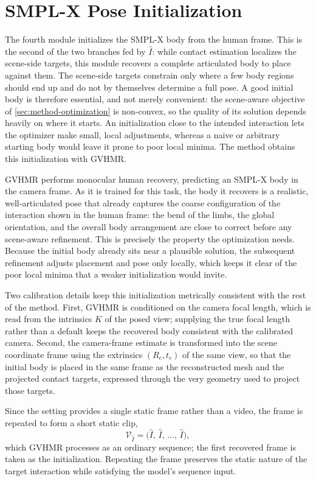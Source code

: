 \section{SMPL-X Pose Initialization}
\label{sec:method-pose-init}

The fourth module initializes the SMPL-X body from the human frame. This is the second of the two branches fed by $\hat{I}$: while contact estimation localizes the scene-side targets, this module recovers a complete articulated body to place against them. The scene-side targets constrain only where a few body regions should end up and do not by themselves determine a full pose. A good initial body is therefore essential, and not merely convenient: the scene-aware objective of \cref{sec:method-optimization} is non-convex, so the quality of its solution depends heavily on where it starts. An initialization close to the intended interaction lets the optimizer make small, local adjustments, whereas a naive or arbitrary starting body would leave it prone to poor local minima. The method obtains this initialization with GVHMR.

GVHMR performs monocular human recovery, predicting an SMPL-X body in the camera frame. As it is trained for this task, the body it recovers is a realistic, well-articulated pose that already captures the coarse configuration of the interaction shown in the human frame: the bend of the limbs, the global orientation, and the overall body arrangement are close to correct before any scene-aware refinement. This is precisely the property the optimization needs. Because the initial body already sits near a plausible solution, the subsequent refinement adjusts placement and pose only locally, which keeps it clear of the poor local minima that a weaker initialization would invite.

Two calibration details keep this initialization metrically consistent with the rest of the method. First, GVHMR is conditioned on the camera focal length, which is read from the intrinsics $K$ of the posed view; supplying the true focal length rather than a default keeps the recovered body consistent with the calibrated camera. Second, the camera-frame estimate is transformed into the scene coordinate frame using the extrinsics $(R_c, t_c)$ of the same view, so that the initial body is placed in the same frame as the reconstructed mesh and the projected contact targets, expressed through the very geometry used to project those targets.

Since the setting provides a single static frame rather than a video, the frame is repeated to form a short static clip,
\begin{equation}
\label{eq:static-human-clip}
\mathcal{V}_{\hat{I}} = \bigl( \hat{I},\, \hat{I},\, \ldots,\, \hat{I} \bigr),
\end{equation}
which GVHMR processes as an ordinary sequence; the first recovered frame is taken as the initialization. Repeating the frame preserves the static nature of the target interaction while satisfying the model's sequence input.

